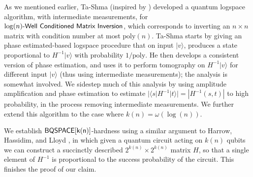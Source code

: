\documentclass[11pt]{article}
\newcommand{\classfont}{\sf}
\newtheorem{theorem}[lemma]{Theorem}
\newtheorem{corollary}[lemma]{Corollary}
\newtheorem{definition}[lemma]{Definition}
\numberwithin{lemma}{section}
\theoremstyle{definition}
\newcommand\BQSPACE{\sf{BQSPACE}}
\newcommand\Logspace{{\sf{L}}}
\newcommand\bigoh{\mathcal{O}}
\newcommand{\Unitary}{\mathbf{U}}
\newcommand{\unitaryBQL}{{\classfont{BQL}}}
\newcommand{\poly}{\mathrm{poly}}
\renewcommand{\leq}{\leqslant}
\renewcommand{\geq}{\geqslant}
\renewcommand{\le}{\leqslant}
\newcommand{\ket}[1]{|#1\rangle}
\newcommand{\bra}[1]{\langle#1|}
\newcommand\matrixinversion[1]{#1\textit{\sf{-Well Conditioned Matrix Inversion}}}
\begin{document}
As we mentioned earlier, Ta-Shma \cite{tashma} (inspired by \cite{HHL}) developed a quantum logspace algorithm, with intermediate measurements, for $\matrixinversion{\log(n)}$, which corresponds to inverting an $n \times n$ matrix with condition number at most $\poly(n)$. Ta-Shma starts by giving an phase estimated-based logspace procedure that on input $\ket{v}$, produces a state proportional to $H^{-1}\ket{v}$ with probability $1/\poly$. He then develops a consistent version of phase estimation, and uses it to perform tomography on $H^{-1}\ket{v}$ for different input $\ket{v}$ (thus using intermediate measurements); the analysis is somewhat involved. We sidestep much of this analysis by using amplitude amplification and phase estimation to estimate $|\bra{s} H^{-1} \ket{t}| = |H^{-1}(s,t)|$ to high probability, in the process removing intermediate measurements. We further extend this algorithm to the case where $k(n) = \omega(\log(n))$.

We establish $\BQSPACE[k(n)]$-hardness using a similar argument to Harrow, Hassidim, and Lloyd \cite{HHL}, in which given a quantum circuit acting on $k(n)$ qubits we can construct a succinctly described $2^{k(n)}\times 2^{k(n)}$ matrix $H$, so that a single element of $H^{-1}$ is proportional to the success probability of the circuit.  This finishes the proof of our claim.  
%
%
 

\end{document}
